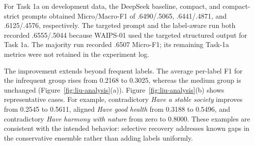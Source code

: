 \documentclass[sigconf,article,a4paper]{acmart}
\begin{document}
For Task 1a on development data, the DeepSeek baseline, compact, and
compact-strict prompts obtained Micro/Macro-F1 of .6490/.5065, .6441/.4871,
and .6125/.4576, respectively. The targeted prompt and the label-aware run both
recorded .6555/.5044 because WAIPS-01 used the targeted structured output for
Task 1a. The majority run recorded .6507 Micro-F1; its remaining Task-1a
metrics were not retained in the experiment log.

The improvement extends beyond frequent labels. The average per-label F1
for the infrequent group rises from 0.2168 to 0.3025, whereas the medium group
is unchanged (Figure~\ref{fig:liu-analysis}(a)). Figure~\ref{fig:liu-analysis}(b)
shows representative cases. For example, contradictory \emph{Have a stable
society} improves from 0.2545 to 0.5611, aligned \emph{Have good health} from
0.3188 to 0.5496, and contradictory \emph{Have harmony with nature} from zero
to 0.8000. These examples are consistent with the intended behavior: selective
recovery addresses known gaps in the conservative ensemble rather than adding
labels uniformly.
\end{document}
